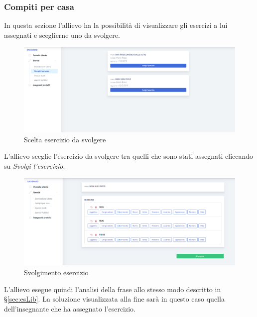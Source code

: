         \newpage
  		\subsubsection{Compiti per casa}
 		  In questa sezione l'allievo ha la possibilità di visualizzare gli esercizi a lui assegnati e sceglierne uno da svolgere.
        	\begin{figure}[H]
            	\centering
            	\includegraphics[width=17cm]{sez/img/studente/compitopercasa.PNG} 
            	\caption{Scelta esercizio da svolgere}\label{fig:1}
        	\end{figure}

		  L'allievo sceglie l'esercizio da svolgere tra quelli che sono stati assegnati cliccando su \textit{Svolgi l'esercizio}.   
       
        	\begin{figure}[H]
            	\centering
            	\includegraphics[width=17cm]{sez/img/studente/svolgimentoesercizio.PNG} 
            	\caption{Svolgimento esercizio}\label{fig:1}
        	\end{figure}      
	L'allievo esegue quindi l'analisi della frase allo stesso modo descritto in \S\ref{sec:esLib}. La soluzione visualizzata alla fine sarà in questo caso quella dell'insegnante che ha assegnato l'esercizio.
        
        
